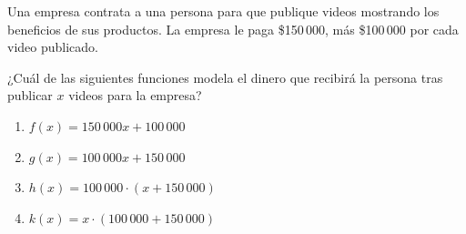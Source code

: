 \begin{problem}
    Una empresa contrata a una persona para que publique videos mostrando los beneficios de sus productos. La empresa le paga \$150\,000, más \$100\,000 por cada video publicado.

    ¿Cuál de las siguientes funciones modela el dinero que recibirá la persona tras publicar $x$ videos para la empresa?

    \begin{enumerate}[label=\Alph*.]
        \item $f(x) = 150\,000x + 100\,000$
        \item $g(x) = 100\,000x + 150\,000$
        \item $h(x) = 100\,000 \cdot (x + 150\,000)$
        \item $k(x) = x \cdot (100\,000 + 150\,000)$
    \end{enumerate}
\end{problem}
